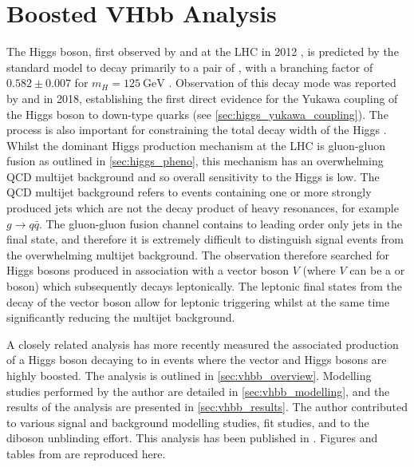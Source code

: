 \chapter{Boosted VHbb Analysis}\label{chap:vhbb_boosted}

The Higgs boson, first observed by \ATLAS and \CMS at the LHC in 2012 \cite{HIGG-2012-27,CMS-HIG-12-028}, is predicted by the standard model to decay primarily to a pair of \bquarks, with a branching factor of $0.582 \pm 0.007$ for $m_H = \SI{125}{\GeV}$ \cite{deFlorian:2016spz}. 
Observation of this decay mode was reported by \ATLAS \cite{HIGG-2018-04} and \CMS \cite{CMS-HIG-18-016} in 2018, establishing the first direct evidence for the Yukawa coupling of the Higgs boson to down-type quarks (see \cref{sec:higgs_yukawa_coupling}).
The \Hbb process is also important for constraining the total decay width of the Higgs \cite{Lafaye:2009vr}.
Whilst the dominant Higgs production mechanism at the LHC is gluon-gluon fusion as outlined in \cref{sec:higgs_pheno}, this mechanism has an overwhelming QCD multijet background and so overall sensitivity to the Higgs is low.
The QCD multijet background refers to events containing one or more strongly produced jets which are not the decay product of heavy resonances, for example $g \to q\bar{q}$.
The gluon-gluon fusion channel contains to leading order only jets in the final state, and therefore it is extremely difficult to distinguish signal events from the overwhelming multijet background.
The \hbb observation therefore searched for Higgs bosons produced in association with a vector boson $V$ (where $V$ can be a \Wboson or \Zboson boson) which subsequently decays leptonically.
The leptonic final states from the decay of the vector boson allow for leptonic triggering whilst at the same time significantly reducing the multijet background.

A closely related analysis \cite{HIGG-2018-52} has more recently measured the associated production of a Higgs boson decaying to \bquarks in events where the vector and Higgs bosons are highly boosted.
The analysis is outlined in \cref{sec:vhbb_overview}.
Modelling studies performed by the author are detailed in \cref{sec:vhbb_modelling}, and the results of the analysis are presented in \cref{sec:vhbb_results}.
The author contributed to various signal and background modelling studies, fit studies, and to the diboson unblinding effort.
This analysis has been published in .
Figures and tables from  are reproduced here.

